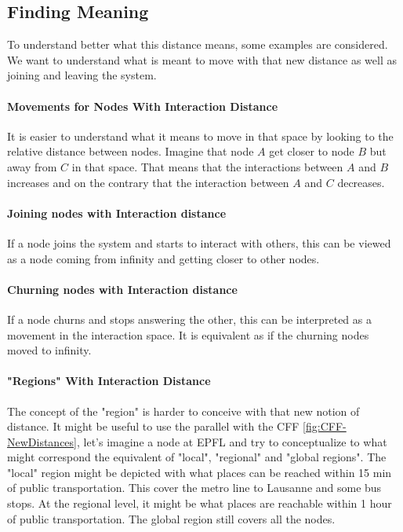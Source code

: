 \documentclass[a4paper,11pt,oneside]{report}
\begin{document}
\subsection{Finding Meaning}
To understand better what this distance means, some examples are
considered. We want to understand what is meant to move with that new distance as
well as joining and leaving the system. 

\paragraph{Movements for Nodes With Interaction Distance}
It is easier to understand what it means to move in that space by looking to
the relative distance between nodes. Imagine that node $A$ get closer to node
$B$ but away from $C$ in that space. That means that the interactions between
$A$ and $B$ increases and on the contrary that the interaction between $A$ and
$C$ decreases.

\paragraph{Joining nodes with Interaction distance}
If a node joins the system and starts to interact with others, this can be
viewed as a node coming from infinity and getting closer to other
nodes.

\paragraph{Churning nodes with Interaction distance}
If a node churns and stops answering the other, this can be interpreted as a
movement in the interaction space. It is equivalent as if the churning nodes moved
to infinity.  

\paragraph{"Regions" With Interaction Distance} \label{par:section-example}
The concept of the "region" is harder to conceive with that new notion of
distance. It might be useful to use the parallel with the CFF
\autoref{fig:CFF-NewDistances}, let's imagine a node at EPFL and try to
conceptualize to what might correspond the equivalent of "local", "regional" and "global regions". The "local" region might be depicted with what places can
be reached within 15 min of public transportation. This cover the metro
line to Lausanne and some bus stops. At the regional level, it might be what
places are reachable within 1 hour of public transportation. The global region still
covers all the nodes.
\end{document}
